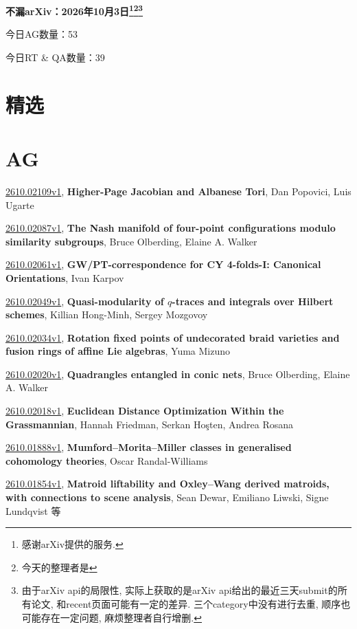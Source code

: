 \documentclass[9pt, a4paper]{article}
\theoremstyle{plain}
\theoremstyle{definition}
\theoremstyle{remark}
\newcommand{\arxiv}[3]{\href{https://arxiv.org/abs/#1}{#1}, \textbf{\textcolor{arxivblue}{#2}}, #3}
\newcommand{\AGnumber}{53}
\newcommand{\RTQAnumber}{39}
\newcommand{\NewestDate}{2026年10月3日}
\newcommand{\todayarXiver}{} %
\begin{document}
\begin{center}
    \Huge\textbf{不漏arXiv：\NewestDate\footnote{感谢arXiv提供的服务.}\footnote{今天的整理者是\todayarXiver}\footnote{由于arXiv api的局限性, 实际上获取的是arXiv api给出的最近三天submit的所有论文, 和recent页面可能有一定的差异. 三个category中没有进行去重, 顺序也可能存在一定问题, 麻烦整理者自行增删.}} \\
\end{center}

\setcounter{section}{-1}

\begin{center}
    今日AG数量：\AGnumber
    
    今日RT \& QA数量：\RTQAnumber
    
\end{center}


\section{精选}


\section{AG}
\arxiv{2610.02109v1}{Higher-Page Jacobian and Albanese Tori}{Dan Popovici, Luis Ugarte}

\arxiv{2610.02087v1}{The Nash manifold of four-point configurations modulo similarity subgroups}{Bruce Olberding, Elaine A. Walker}

\arxiv{2610.02061v1}{GW/PT-correspondence for CY 4-folds-I: Canonical Orientations}{Ivan Karpov}

\arxiv{2610.02049v1}{Quasi-modularity of $q$-traces and integrals over Hilbert schemes}{Killian Hong-Minh, Sergey Mozgovoy}

\arxiv{2610.02034v1}{Rotation fixed points of undecorated braid varieties and fusion rings of affine Lie algebras}{Yuma Mizuno}

\arxiv{2610.02020v1}{Quadrangles entangled in conic nets}{Bruce Olberding, Elaine A. Walker}

\arxiv{2610.02018v1}{Euclidean Distance Optimization Within the Grassmannian}{Hannah Friedman, Serkan Hoşten, Andrea Rosana}

\arxiv{2610.01888v1}{Mumford--Morita--Miller classes in generalised cohomology theories}{Oscar Randal-Williams}

\arxiv{2610.01854v1}{Matroid liftability and Oxley--Wang derived matroids, with connections to scene analysis}{Sean Dewar, Emiliano Liwski, Signe Lundqvist 等}
\end{document}
